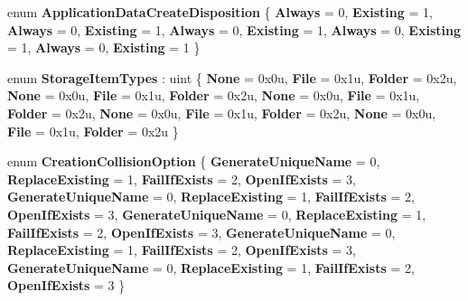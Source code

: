 \begin{DoxyCompactItemize}
enum {\bfseries Application\+Data\+Create\+Disposition} \{ \newline
{\bfseries Always} = 0, 
{\bfseries Existing} = 1, 
{\bfseries Always} = 0, 
{\bfseries Existing} = 1, 
\newline
{\bfseries Always} = 0, 
{\bfseries Existing} = 1, 
{\bfseries Always} = 0, 
{\bfseries Existing} = 1, 
\newline
{\bfseries Always} = 0, 
{\bfseries Existing} = 1
 \}
\item 
\mbox{\label{namespace_windows_1_1_storage_afbbba3be392001933e27301572dd9adc}} 
enum {\bfseries Storage\+Item\+Types} \+: uint \{ \newline
{\bfseries None} = 0x0u, 
{\bfseries File} = 0x1u, 
{\bfseries Folder} = 0x2u, 
{\bfseries None} = 0x0u, 
\newline
{\bfseries File} = 0x1u, 
{\bfseries Folder} = 0x2u, 
{\bfseries None} = 0x0u, 
{\bfseries File} = 0x1u, 
\newline
{\bfseries Folder} = 0x2u, 
{\bfseries None} = 0x0u, 
{\bfseries File} = 0x1u, 
{\bfseries Folder} = 0x2u, 
\newline
{\bfseries None} = 0x0u, 
{\bfseries File} = 0x1u, 
{\bfseries Folder} = 0x2u
 \}
\item 
\mbox{\label{namespace_windows_1_1_storage_a47f58c5ed62127e58f4cd3b2e14d0bfb}} 
enum {\bfseries Creation\+Collision\+Option} \{ \newline
{\bfseries Generate\+Unique\+Name} = 0, 
{\bfseries Replace\+Existing} = 1, 
{\bfseries Fail\+If\+Exists} = 2, 
{\bfseries Open\+If\+Exists} = 3, 
\newline
{\bfseries Generate\+Unique\+Name} = 0, 
{\bfseries Replace\+Existing} = 1, 
{\bfseries Fail\+If\+Exists} = 2, 
{\bfseries Open\+If\+Exists} = 3, 
\newline
{\bfseries Generate\+Unique\+Name} = 0, 
{\bfseries Replace\+Existing} = 1, 
{\bfseries Fail\+If\+Exists} = 2, 
{\bfseries Open\+If\+Exists} = 3, 
\newline
{\bfseries Generate\+Unique\+Name} = 0, 
{\bfseries Replace\+Existing} = 1, 
{\bfseries Fail\+If\+Exists} = 2, 
{\bfseries Open\+If\+Exists} = 3, 
\newline
{\bfseries Generate\+Unique\+Name} = 0, 
{\bfseries Replace\+Existing} = 1, 
{\bfseries Fail\+If\+Exists} = 2, 
{\bfseries Open\+If\+Exists} = 3
 \}
\item 

\end{DoxyCompactItemize}
